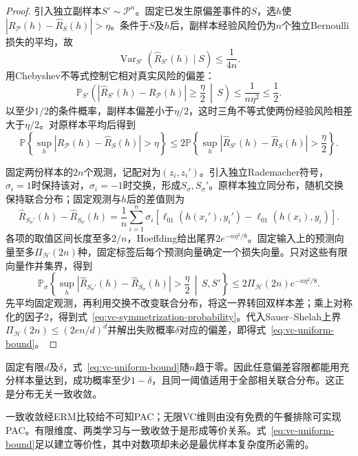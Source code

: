 \begin{proof}
引入独立副样本$S'\sim\mathcal P^n$。固定已发生原偏差事件的$S$，选$h$使$|R_{\mathcal P}(h)-\hat R_S(h)|>\eta$。条件于$S$及$h$后，副样本经验风险仍为$n$个独立Bernoulli损失的平均，故
\[
 \operatorname{Var}_{S'}\!\left(\hat R_{S'}(h)\mid S\right)
 \leq\frac{1}{4n}.
\]
用Chebyshev不等式控制它相对真实风险的偏差：
\[
 \mathbb P_{S'}\left(
   |\hat R_{S'}(h)-R_{\mathcal P}(h)|\geq\frac{\eta}{2}
   \,\middle|\,S
 \right)
 \leq\frac{1}{n\eta^2}\leq\frac12.
\]
以至少$1/2$的条件概率，副样本偏差小于$\eta/2$，这时三角不等式使两份经验风险相差大于$\eta/2$。对原样本平均后得到
\[
 \mathbb P\left\{\sup_h|R_{\mathcal P}(h)-\hat R_S(h)|>\eta\right\}
 \leq
 2\mathbb P\left\{\sup_h|\hat R_{S'}(h)-\hat R_S(h)|>\frac\eta2\right\}.
\]

固定两份样本的$2n$个观测，记配对为$(z_i,z_i')$。引入独立Rademacher符号，$\sigma_i=1$时保持该对，$\sigma_i=-1$时交换，形成$S_\sigma,S_\sigma'$。原样本独立同分布，随机交换保持联合分布；固定观测与$h$后的差值则为
\[
 \hat R_{S_\sigma'}(h)-\hat R_{S_\sigma}(h)
 =\frac1n\sum_{i=1}^n\sigma_i
 \left[\ell_{01}(h(x_i'),y_i')-\ell_{01}(h(x_i),y_i)\right].
\]
各项的取值区间长度至多$2/n$，Hoeffding给出尾界$2e^{-n\eta^2/8}$。固定输入上的预测向量至多$\Pi_{\mathcal H}(2n)$种，固定标签后每个预测向量确定一个损失向量。只对这些有限向量作并集界，得到
\[
 \mathbb P_\sigma\left\{
   \sup_h|\hat R_{S_\sigma'}(h)-\hat R_{S_\sigma}(h)|>\frac\eta2
   \,\middle|\,S,S'
 \right\}
 \leq2\Pi_{\mathcal H}(2n)e^{-n\eta^2/8}.
\]
先平均固定观测，再利用交换不改变联合分布，将这一界转回双样本差；乘上对称化的因子2，得到式~\eqref{eq:vc-symmetrization-probability}。代入Sauer--Shelah上界$\Pi_{\mathcal H}(2n)\leq(2en/d)^d$并解出失败概率$\delta$对应的偏差，即得式~\eqref{eq:vc-uniform-bound}。
\end{proof}

固定有限$d$及$\delta$，式~\eqref{eq:vc-uniform-bound}随$n$趋于零。因此任意偏差容限都能用充分样本量达到，成功概率至少$1-\delta$，且同一阈值适用于全部相关联合分布。这正是分布无关一致收敛。

一致收敛经ERM比较给不可知PAC；无限VC维则由没有免费的午餐排除可实现PAC。有限维度、两类学习与一致收敛于是形成等价关系。式~\eqref{eq:vc-uniform-bound}足以建立等价性，其中对数项却未必是最优样本复杂度所必需的。

